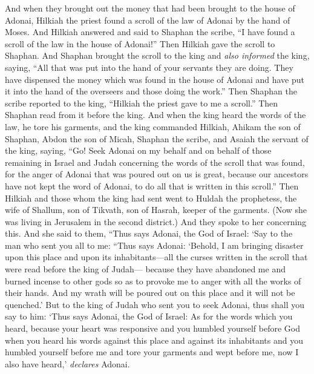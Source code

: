 \begin{biblechapter}
\verse And when they brought out the money that had been brought to the house of Adonai, Hilkiah the priest found a scroll of the law of Adonai by the hand of Moses.
\verse And Hilkiah answered and said to Shaphan the scribe, “I have found a scroll of the law in the house of Adonai!” Then Hilkiah gave the scroll to Shaphan.
\verse And Shaphan brought the scroll to the king and \textit{also informed} the king, saying, “All that was put into the hand of your servants they are doing.
\verse They have dispensed the money which was found in the house of Adonai and have put it into the hand of the overseers and those doing the work.”
\verse Then Shaphan the scribe reported to the king, “Hilkiah the priest gave to me a scroll.” Then Shaphan read from it before the king.
\verse And when the king heard the words of the law, he tore his garments,
\verse and the king commanded Hilkiah, Ahikam the son of Shaphan, Abdon the son of Micah, Shaphan the scribe, and Asaiah the servant of the king, saying,
\verse “Go! Seek Adonai on my behalf and on behalf of those remaining in Israel and Judah concerning the words of the scroll that was found, for the anger of Adonai that was poured out on us is great, because our ancestors have not kept the word of Adonai, to do all that is written in this scroll.”
\verse Then Hilkiah and those whom the king had sent went to Huldah the prophetess, the wife of Shallum, son of Tikvath, son of Hasrah, keeper of the garments. (Now she was living in Jerusalem in the second district.) And they spoke to her concerning this.
\verse And she said to them, “Thus says Adonai, the God of Israel: ‘Say to the man who sent you all to me:
\verse “Thus says Adonai: ‘Behold, I am bringing disaster upon this place and upon its inhabitants—all the curses written in the scroll that were read before the king of Judah—
\verse because they have abandoned me and burned incense to other gods so as to provoke me to anger with all the works of their hands. And my wrath will be poured out on this place and it will not be quenched.’
\verse But to the king of Judah who sent you to seek Adonai, thus shall you say to him: ‘Thus says Adonai, the God of Israel: As for the words which you heard,
\verse because your heart was responsive and you humbled yourself before God when you heard his words against this place and against its inhabitants and you humbled yourself before me and tore your garments and wept before me, now I also have heard,’ \textit{declares} Adonai.

\end{biblechapter}
